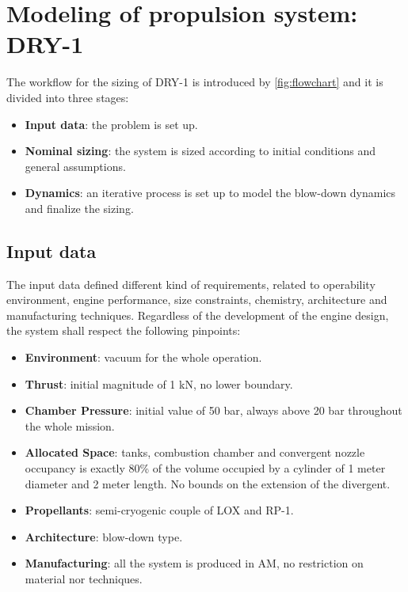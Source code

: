 \section{Modeling of propulsion system: DRY-1}
\label{sec:modeling}

\pagebreak
The workflow for the sizing of DRY-1 is introduced by \autoref{fig:flowchart} and it is divided into three stages:
\begin{itemize}
    \item \textbf{Input data}:  the problem is set up. 
    \item \textbf{Nominal sizing}: the system is sized according to initial conditions and general assumptions.
    \item \textbf{Dynamics}: an iterative process is set up to model the blow-down dynamics and finalize the sizing.
\end{itemize}


\subsection{Input data}
\label{subsec:input}
The input data defined different kind of requirements, related to operability environment, engine performance, size constraints, chemistry, architecture and manufacturing techniques. Regardless of the development of the engine design, the system shall respect the following pinpoints:
\begin{itemize}
    \item \textbf{Environment}: vacuum for the whole operation.
    \item \textbf{Thrust}: initial magnitude of 1 kN, no lower boundary.
    \item \textbf{Chamber Pressure}: initial value of 50 bar, always above 20 bar throughout the whole mission.
    \item \textbf{Allocated Space}: tanks, combustion chamber and convergent nozzle occupancy is exactly 80\% of the volume occupied by a cylinder of 1 meter diameter and 2 meter length. No bounds on the extension of the divergent.
    \item \textbf{Propellants}: semi-cryogenic couple of LOX and RP-1.
    \item \textbf{Architecture}: blow-down type.
    \item \textbf{Manufacturing}: all the system is produced in AM, no restriction on material nor techniques. 
\end{itemize} 

